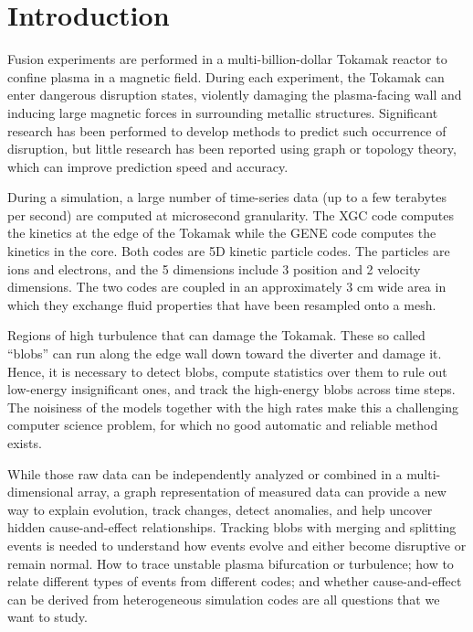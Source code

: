 \newcommand{\cA}{\mathcal{A}} %
\newcommand{\R}{\mathbb{R}} %
\newcommand{\cD}{\mathcal{D}} %
\newcommand{\cC}{\mathcal{C}} %
\newcommand{\Xs}{X^*} %
\newcommand{\cN}{\mathcal{N}} %


\section{Introduction}
\label{sec:intro}

Fusion experiments are performed in a multi-billion-dollar Tokamak reactor to confine plasma in a magnetic field. During each experiment, the Tokamak can enter dangerous disruption states, violently damaging the plasma-facing wall and inducing large magnetic forces in surrounding metallic structures. Significant research has been performed to develop methods to predict such occurrence of disruption, but little research has been reported using graph or topology theory, which can improve prediction speed and accuracy.

During a simulation, a large number of time-series data (up to a few terabytes per second) are computed at microsecond granularity. The XGC code computes the kinetics at the edge of the Tokamak while the GENE code computes the kinetics in the core. Both codes are 5D kinetic particle codes. The particles are ions and electrons, and the 5 dimensions include 3 position and 2 velocity dimensions. The two codes are coupled in an approximately 3 cm wide area in which they exchange fluid properties that have been resampled onto a mesh.

Regions of high turbulence that can damage the Tokamak.  These so called ``blobs'' can run along the edge wall down toward the diverter and damage it.  Hence, it is necessary to detect blobs, compute statistics over them to rule out low-energy insignificant ones, and track the high-energy blobs across time steps. The noisiness of the models together with the high rates make this a challenging computer science problem, for which no good automatic and reliable method exists.

While those raw data can be independently analyzed or combined in a multi-dimensional array, a graph representation of measured data can provide a new way to explain evolution, track changes, detect anomalies, and help uncover hidden cause-and-effect relationships. Tracking blobs with merging and splitting events is needed to understand how events evolve and either become disruptive or remain normal.  How to trace unstable plasma bifurcation or turbulence; how to relate different types of events from different codes; and whether cause-and-effect can be derived from heterogeneous simulation codes are all questions that we want to study.

